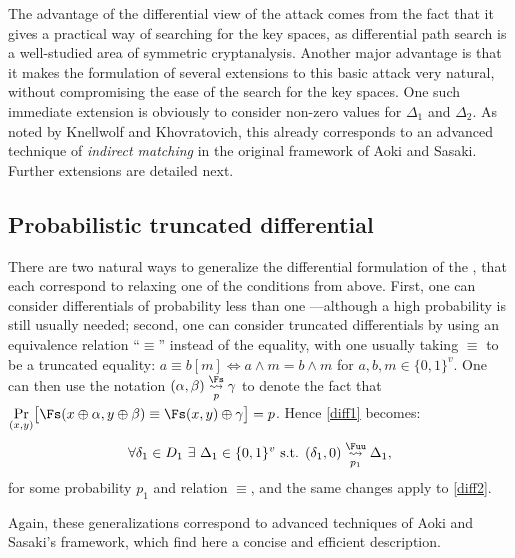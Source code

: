 The advantage of the differential view of the \mitm attack comes from the fact that it gives a practical way of searching for the key spaces,
as differential path search is a well-studied area of symmetric cryptanalysis. Another major advantage is that it makes the formulation of
several extensions to this basic attack very natural, without compromising the ease of the search for the key spaces. One such immediate
extension is obviously to consider non-zero values for $\Delta_1$ and $\Delta_2$. As noted by Knellwolf and Khovratovich,
this already corresponds to an advanced technique of \emph{indirect matching} in the original framework of Aoki and Sasaki.
Further extensions are detailed next.

\subsection{Probabilistic truncated differential \mitm}
\label{probtrunc}

There are two natural ways to generalize the differential formulation of the \mitm, that each correspond to relaxing one of the conditions from
above. First, one can consider differentials of probability less than one ---although a high probability is still usually needed;
second, one can consider truncated differentials by using an
equivalence relation ``$\equiv$'' instead of the equality, with one usually taking $\equiv$ to be a truncated equality:
$a \equiv b [m] \Leftrightarrow a \wedge m = b \wedge m$ for $a, b, m
\in \{0,1\}^v$.
One can then use the notation
$(\alpha,  \beta) \overset{\Fs}{\underset{p}{\rightsquigarrow}} \gamma$ to denote the fact that 
$\underset{(x,y)}{\Pr}\big[\Fs(x \oplus \alpha, y \oplus \beta) \equiv \Fs(x, y) \oplus \gamma\big] = p$. Hence \autoref{diff1} becomes:
\begin{equation}
\forall \delta_1 \in D_1~\exists~ \Delta_1 \in \{0,1\}^v \text{ s.t. } (\delta_1, 0) \overset{\Fuu}{\underset{p_1}{\rightsquigarrow}} \Delta_1,
\end{equation}
for some probability $p_1$ and relation $\equiv$, and the same changes apply to \autoref{diff2}.

Again, these generalizations correspond to advanced techniques of Aoki and Sasaki's framework, which find here a concise and efficient description.

\medskip

